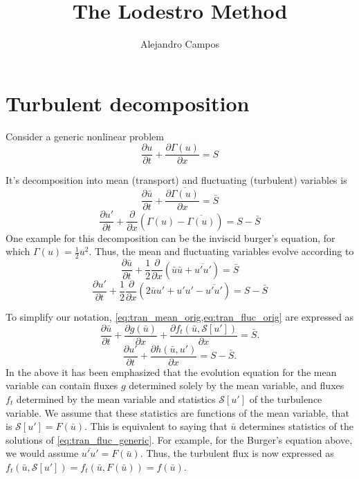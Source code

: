 \documentclass{article}
\title{The Lodestro Method}
\author{Alejandro Campos}
\date{}
\begin{document}
\maketitle

\section{Turbulent decomposition}
Consider a generic nonlinear problem
\begin{equation}
\label{eq:gov_eq}
\frac{\partial u}{\partial t} + \frac{\partial \Gamma (u)}{\partial x} = S
\end{equation}

It's decomposition into mean (transport) and fluctuating (turbulent) variables is
\begin{equation}
\label{eq:tran_mean_orig}
\frac{\partial \bar{u}}{\partial t} + \frac{\partial \overline{\Gamma (u)} }{\partial x} = \bar{S}
\end{equation}
\begin{equation}
\label{eq:tran_fluc_orig}
\frac{\partial u'}{\partial t} + \frac{ \partial }{\partial x} \left( \Gamma(u) - \overline{\Gamma(u)} \right) = S - \bar{S}
\end{equation}
One example for this decomposition can be the inviscid burger's equation, for which $\Gamma (u) = \frac{1}{2} u^2$. Thus, the mean and fluctuating variables evolve according to
\begin{equation}
\frac{\partial \bar{u}}{\partial t} + \frac{1}{2} \frac{\partial}{\partial x} \left ( \bar{u}\bar{u} + \overline{u'u'} \right) = \bar{S}
\end{equation}
\begin{equation}
\frac{\partial u'}{\partial t} + \frac{1}{2}\frac{ \partial }{\partial x} \left( 2\bar{u} u' + u'u' - \overline{u'u'} \right) = S - \bar{S}
\end{equation}

To simplify our notation, \cref{eq:tran_mean_orig,eq:tran_fluc_orig} are expressed as 
\begin{equation}
\label{eq:tran_mean_generic}
\frac{\partial \bar{u}}{\partial t} + \frac{\partial g(\bar{u})}{\partial x} + \frac{\partial f_t(\bar{u}, \mathcal{S}[u'])}{\partial x} = \bar{S}.
\end{equation}
\begin{equation}
\label{eq:tran_fluc_generic}
\frac{\partial u'}{\partial t} + \frac{ \partial h(\bar{u},u') }{\partial x} = S - \bar{S}.
\end{equation}
In the above it has been emphasized that the evolution equation for the mean variable can contain fluxes $g$ determined solely by the mean variable, and fluxes $f_t$ determined by the mean variable and statistics $\mathcal{S}[u']$ of the turbulence variable. We assume that these statistics are functions of the mean variable, that is $\mathcal{S}[u'] = F(\bar{u})$. This is equivalent to saying that $\bar{u}$ determines statistics of the solutions of \cref{eq:tran_fluc_generic}. For example, for the Burger's equation above, we would assume $\overline{u'u'} = F(\bar{u})$. Thus, the turbulent flux is now expressed as $f_t(\bar{u}, \mathcal{S}[u']) = f_t(\bar{u}, F(\bar{u})) = f(\bar{u})$.
\end{document}
